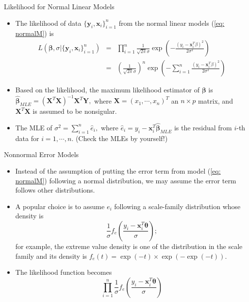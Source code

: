 \documentclass{beamer}
\begin{document}
    \begin{frame}{Likelihood for Normal Linear Models}
        \begin{itemize}
            \item The likelihood of data $\{\boldsymbol{y}_{i}, \boldsymbol{x}_{i}\}^{n}_{i=1}$ from the normal linear models (\ref{eq: normalM}) is
            \begin{eqnarray}
                L(\boldsymbol{\beta}, \sigma |\{\boldsymbol{y}_{i}, \boldsymbol{x}_{i}\}^{n}_{i=1}) & = & \prod^{n}_{i=1}\frac{1}{\sqrt{2\pi}\sigma}\exp\left(-\frac{(y_{i}-\boldsymbol{x}^{T}_{i}\beta)^2}{2\sigma^2}\right) \nonumber \\
                & = & \left(\frac{1}{\sqrt{2\pi}\sigma}\right)^{n}\exp\left(-\sum^{n}_{i=1}\frac{(y_{i}-\boldsymbol{x}^{T}_{i}\beta)^2}{2\sigma^2}\right) \nonumber
            \end{eqnarray}
            \item Based on the likelihood, the maximum likelihood estimator of $\boldsymbol{\beta}$ is $\hat{\boldsymbol{\beta}}_{MLE} = (\boldsymbol{X}^{T}\boldsymbol{X})^{-1}\boldsymbol{X}^{T}\boldsymbol{Y},$
            where $\boldsymbol{X} = (x_{1}, \cdots, x_{n})^{T}$ an $n \times p$ matrix, and $\boldsymbol{X}^{T}\boldsymbol{X}$ is assumed to be nonsigular.
            \item The MLE of $\sigma^2 = \sum^{n}_{i=1} \hat{e}_{i},$
            where $\hat{e}_{i} = y_{i} - \boldsymbol{x}^{T}_{i}\hat{\boldsymbol{\beta}}_{MLE}$ is the residual from $i$-th data for $i = 1, \cdots, n$. (Check the MLEs by yourself!)
        \end{itemize}
    \end{frame}


    \begin{frame}{Nonnormal Error Models}
        \begin{itemize}
            \item Instead of the assumption of putting the error term from model (\ref{eq: normalM}) following a  normal distribution, we may assume the error term follows other distributions.
            \item A popular choice is to assume $e_{i}$ following a scale-family distribution whose density is \begin{equation}
            \frac{1}{\sigma}f_{e}\left(\frac{y_{i} - \boldsymbol{x}^{T}_{i}\boldsymbol{\theta}}{\sigma}\right);
            \end{equation}
            for example, the extreme value density is one of the distribution in the scale family and its density is $f_{e}(t) = \exp(-t) \times \exp(-\exp(-t)).$
        \item The likelihood function becomes
        $$\prod^{n}_{i=1}\frac{1}{\sigma}f_{e}\left(\frac{y_{i} - \boldsymbol{x}^{T}_{i}\boldsymbol{\theta}}{\sigma}\right)$$
        \end{itemize}
    \end{frame}
    
\end{document}
